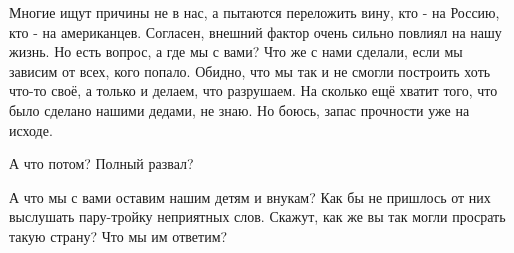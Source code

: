 Многие ищут причины не в нас, а пытаются переложить вину,
кто - на Россию, кто - на американцев. Согласен, внешний фактор очень сильно
повлиял на нашу жизнь. Но есть вопрос, а где мы с вами? Что же с нами сделали,
если мы зависим от всех, кого попало. Обидно, что мы так и не смогли построить
хоть что-то своё, а только и делаем, что разрушаем. На сколько ещё хватит того,
что было сделано нашими дедами, не знаю. Но боюсь, запас прочности уже на
исходе. 

А что потом? Полный развал? 

А что мы с вами оставим нашим детям и внукам? Как бы не пришлось от них
выслушать пару-тройку неприятных слов. Скажут, как же вы так могли просрать
такую страну? Что мы им ответим?

